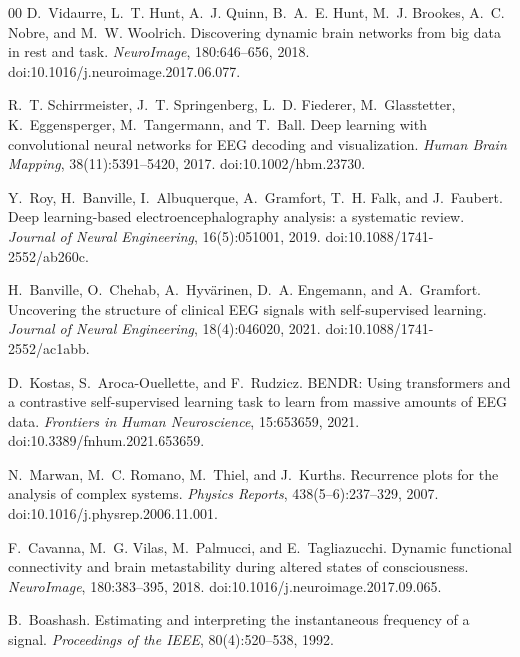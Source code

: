 \documentclass[5p,twocolumn,authoryear]{elsarticle}
\begin{document}
\begin{thebibliography}{00}
D.~Vidaurre, L.~T. Hunt, A.~J. Quinn, B.~A.~E. Hunt, M.~J. Brookes, A.~C. Nobre, and M.~W. Woolrich.
\newblock Discovering dynamic brain networks from big data in rest and task.
\newblock \emph{NeuroImage}, 180:646--656, 2018.
\newblock doi:10.1016/j.neuroimage.2017.06.077.

R.~T. Schirrmeister, J.~T. Springenberg, L.~D. Fiederer, M.~Glasstetter, K.~Eggensperger, M.~Tangermann, and T.~Ball.
\newblock Deep learning with convolutional neural networks for EEG decoding and visualization.
\newblock \emph{Human Brain Mapping}, 38(11):5391--5420, 2017.
\newblock doi:10.1002/hbm.23730.

Y.~Roy, H.~Banville, I.~Albuquerque, A.~Gramfort, T.~H. Falk, and J.~Faubert.
\newblock Deep learning-based electroencephalography analysis: a systematic review.
\newblock \emph{Journal of Neural Engineering}, 16(5):051001, 2019.
\newblock doi:10.1088/1741-2552/ab260c.

H.~Banville, O.~Chehab, A.~Hyv{\"a}rinen, D.~A. Engemann, and A.~Gramfort.
\newblock Uncovering the structure of clinical EEG signals with self-supervised learning.
\newblock \emph{Journal of Neural Engineering}, 18(4):046020, 2021.
\newblock doi:10.1088/1741-2552/ac1abb.

D.~Kostas, S.~Aroca-Ouellette, and F.~Rudzicz.
\newblock BENDR: Using transformers and a contrastive self-supervised learning task to learn from massive amounts of EEG data.
\newblock \emph{Frontiers in Human Neuroscience}, 15:653659, 2021.
\newblock doi:10.3389/fnhum.2021.653659.

N.~Marwan, M.~C. Romano, M.~Thiel, and J.~Kurths.
\newblock Recurrence plots for the analysis of complex systems.
\newblock \emph{Physics Reports}, 438(5--6):237--329, 2007.
\newblock doi:10.1016/j.physrep.2006.11.001.

F.~Cavanna, M.~G. Vilas, M.~Palmucci, and E.~Tagliazucchi.
\newblock Dynamic functional connectivity and brain metastability during altered states of consciousness.
\newblock \emph{NeuroImage}, 180:383--395, 2018.
\newblock doi:10.1016/j.neuroimage.2017.09.065.

B.~Boashash.
\newblock Estimating and interpreting the instantaneous frequency of a signal.
\newblock \emph{Proceedings of the IEEE}, 80(4):520--538, 1992.


\end{thebibliography}
\end{document}

